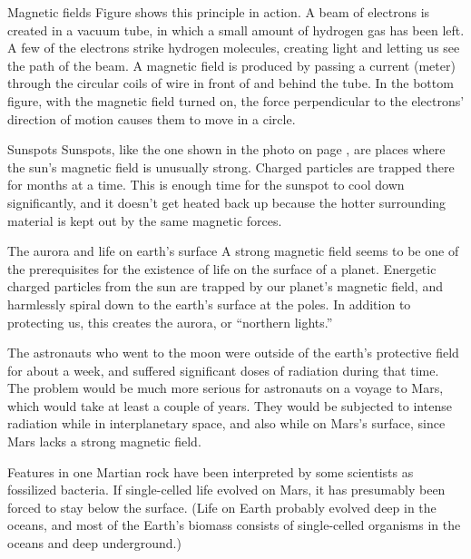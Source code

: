 \begin{envsubsection}{Magnetic fields}
Figure  shows this principle in action. A beam of electrons is
created in a vacuum tube, in which a small amount of hydrogen gas has been left.
A few of the electrons strike hydrogen molecules, creating light and letting us see
the path of the beam. A magnetic
field is produced by passing a current (meter) through the circular
coils of wire in front of and behind the tube. In the bottom figure,
with the magnetic field turned on, the force perpendicular to the
electrons' direction of motion causes them to move in a circle.
	

\begin{eg}{Sunspots}
Sunspots, like the one shown in the photo on page \pageref{sunspotphoto}, are places where the sun's
magnetic field is unusually strong. Charged particles are trapped there for months at a time. This
is enough time for the sunspot to cool down significantly, and it doesn't get heated back up because
the hotter surrounding material is kept out by the same magnetic forces.
\end{eg}

\begin{eg}{The aurora and life on earth's surface}
A strong magnetic field seems to be one of the prerequisites for the existence of life on the surface
of a planet. Energetic charged particles from the sun are trapped by our planet's
magnetic field, and harmlessly spiral down to the earth's surface at the poles. In addition to protecting us,
this creates the aurora, or ``northern lights.''

 The astronauts who went to the moon
were outside of the earth's protective field for about a week, and suffered significant doses of radiation
during that time. The problem would be much more serious for astronauts on a voyage to Mars, which would
take at least a couple of years. They would be subjected to intense radiation while in interplanetary space,
and also while on Mars's surface, since Mars lacks a strong magnetic field.

Features in one Martian rock have been interpreted by some scientists as fossilized bacteria.
If single-celled life evolved on Mars, it has presumably been forced to stay below the surface.
(Life on Earth probably evolved deep in the oceans, and most of the Earth's biomass consists of
single-celled organisms in the oceans and deep underground.)
\end{eg}
\end{envsubsection}

